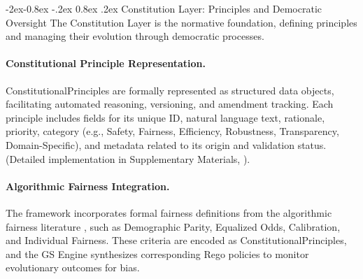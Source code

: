 \documentclass[manuscript,screen,review,anonymous,9pt]{acmart}
\makeatletter
\renewcommand\subsubsection{\@startsection{subsubsection}{3}{\z@}%
  {-2ex\@plus -0.8ex \@minus -.2ex}%
  {0.8ex \@plus .2ex}%
  {\normalfont\normalsize\bfseries}}
\makeatother
\begin{document}
\subsubsection{Constitution Layer: Principles and Democratic Oversight}
\label{subsubsec:constitution_layer}
The Constitution Layer is the normative foundation, defining principles and managing their evolution through democratic processes.

\paragraph{Constitutional Principle Representation.} ConstitutionalPrinciples are formally represented as structured data objects, facilitating automated reasoning, versioning, and amendment tracking. Each principle includes fields for its unique ID, natural language text, rationale, priority, category (e.g., Safety, Fairness, Efficiency, Robustness, Transparency, Domain-Specific), and metadata related to its origin and validation status. (Detailed implementation in Supplementary Materials, ).

\paragraph{Algorithmic Fairness Integration.} The framework incorporates formal fairness definitions from the algorithmic fairness literature \cite{Barocas2023FairnessML, Hardt2016EqualityOpportunity, Chouldechova2017FairPrediction, Dwork2012DifferentialPrivacy}, such as Demographic Parity, Equalized Odds, Calibration, and Individual Fairness. These criteria are encoded as ConstitutionalPrinciples, and the GS Engine synthesizes corresponding Rego policies to monitor evolutionary outcomes for bias.
\end{document}
